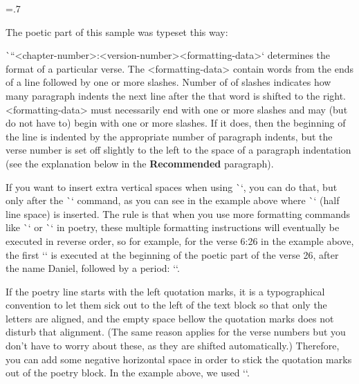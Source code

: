 \medskip
\centerline{\picw=.7\hsize{} }
\vskip-2pt %



The poetic part of this sample was typeset this way:
\begtt
{}
\endtt








\`\fmtpoetry``{<chapter-number>:<version-number>}{<formatting-data>}` determines the 
format of a particular verse. The <formatting-data>
contain words from the ends of a line followed by one or more slashes. Number of
of slashes indicates how many paragraph indents the next line after the
that word is shifted to the right. <formatting-data> must necessarily end with one or more
slashes and may (but do not have to) begin with one or more slashes.  If
it does, then the beginning of the line is indented by the appropriate number of paragraph indents,
but the verse number is set off slightly to the left to the space of a paragraph
indentation (see the explanation below in the {\bf Recommended} paragraph).

If you want to insert extra vertical spaces when using \`\fmtpoetry`, 
you can do that, but only after the \`\fmtpoetry` command, as you can  see in the example above where
\`\medskip` (half line space) is inserted. 
The rule is that when you use more formatting commands like \`\fmtins` or \`\fmtpre` in poetry, 
these multiple formatting instructions will eventually be executed
in reverse order, so for example, for the verse 6:26 in the  example above, 
the first `\medskip` is executed at the beginning of the poetic part of the verse 
26, after the name Daniel, followed by a period: ``.

\recommended
If the poetry line starts with the left quotation marks, it is a typographical convention to let 
them sick out to the left of the text block so that only the letters are aligned, and the empty 
space bellow the quotation marks does not disturb that alignment. (The same reason applies for the verse numbers but you don't have to worry about these, as they are shifted automatically.)
Therefore, you can add some negative horizontal space in order to stick the quotation marks out of 
the poetry block. In the example above, we used `\hglue-2mm`. 


